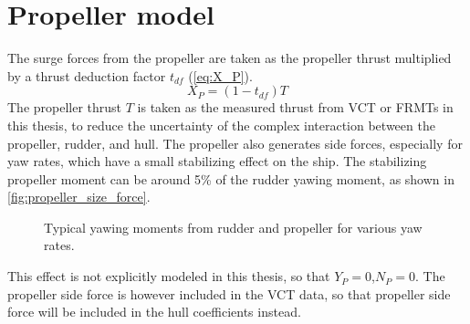 \section{Propeller model} \label{sec:propeller}
The surge forces from the propeller are taken as the propeller thrust multiplied by a thrust deduction factor $t_{df}$ (\autoref{eq:X_P}).
\begin{equation}
    \label{eq:X_P}
    X_P = (1-t_{df})T
\end{equation}
The propeller thrust $T$ is taken as the measured thrust from VCT or FRMTs in this thesis, to reduce the uncertainty of the complex interaction between the propeller, rudder, and hull. The propeller also generates side forces, especially for yaw rates, which have a small stabilizing effect on the ship. The stabilizing propeller moment can be around 5\% of the rudder yawing moment, as shown in \autoref{fig:propeller_size_force}.
\begin{figure}[h]
    \centering
    
    \caption{Typical yawing moments from rudder and propeller for various yaw rates.}
    \label{fig:propeller_size_force}
\end{figure}
This effect is not explicitly modeled in this thesis, so that $Y_P=0$,$N_P=0$. The propeller side force is however included in the VCT data, so that propeller side force will be included in the hull coefficients instead.
